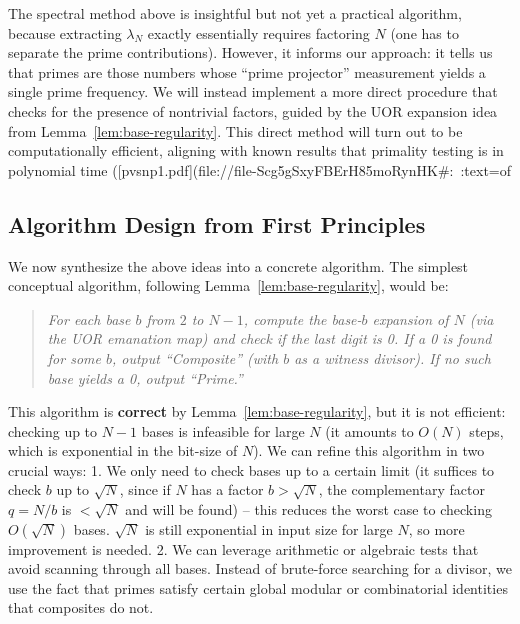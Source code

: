 \documentclass[11pt]{article}
\begin{document}
{\begin{remark}
The spectral method above is insightful but not yet a practical algorithm, because extracting $\lambda_N$ exactly essentially requires factoring $N$ (one has to separate the prime contributions). However, it informs our approach: it tells us that primes are those numbers whose “prime projector” measurement yields a single prime frequency. We will instead implement a more direct procedure that checks for the presence of nontrivial factors, guided by the UOR expansion idea from Lemma~\ref{lem:base-regularity}. This direct method will turn out to be computationally efficient, aligning with known results that primality testing is in polynomial time ([pvsnp1.pdf](file://file-Scg5gSxyFBErH85moRynHK#:~:text=of%
\end{remark}

\subsection{Algorithm Design from First Principles}
We now synthesize the above ideas into a concrete algorithm. The simplest conceptual algorithm, following Lemma~\ref{lem:base-regularity}, would be:

\begin{quote}
\emph{For each base $b$ from $2$ to $N-1$, compute the base-$b$ expansion of $N$ (via the UOR emanation map) and check if the last digit is 0. If a 0 is found for some $b$, output “Composite” (with $b$ as a witness divisor). If no such base yields a 0, output “Prime.”}
\end{quote}

This algorithm is \textbf{correct} by Lemma~\ref{lem:base-regularity}, but it is not efficient: checking up to $N-1$ bases is infeasible for large $N$ (it amounts to $O(N)$ steps, which is exponential in the bit-size of $N$). We can refine this algorithm in two crucial ways:
1. We only need to check bases up to a certain limit (it suffices to check $b$ up to $\sqrt{N}$, since if $N$ has a factor $b > \sqrt{N}$, the complementary factor $q = N/b$ is $< \sqrt{N}$ and will be found) – this reduces the worst case to checking $O(\sqrt{N})$ bases. $\sqrt{N}$ is still exponential in input size for large $N$, so more improvement is needed.
2. We can leverage arithmetic or algebraic tests that avoid scanning through all bases. Instead of brute-force searching for a divisor, we use the fact that primes satisfy certain global modular or combinatorial identities that composites do not.

}
\end{document}
